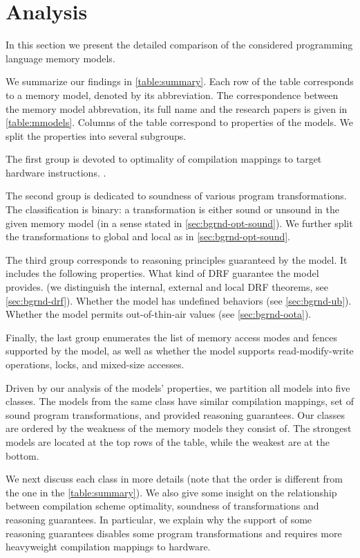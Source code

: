 \section{Analysis}

In this section we present the detailed comparison 
of the considered programming language memory models. 

We summarize our findings in \cref{table:summary}. 
Each row of the table corresponds to a memory model, denoted by its abbreviation. 
The correspondence between the memory model abbrevation, 
its full name and the research papers is given in \cref{table:mmodels}.
Columns of the table correspond to properties of the models. 
We split the properties into several subgroups. 

The first group is devoted to optimality of compilation mappings
to target hardware instructions. 
.

The second group is dedicated to soundness of various program transformations. 
The classification is binary: a transformation is either sound or unsound 
in the given memory model (in a sense stated in \cref{sec:bgrnd-opt-sound}).
We further split the transformations to global and local as in \cref{sec:bgrnd-opt-sound}.

The third group corresponds to reasoning principles guaranteed by the model. 
It includes the following properties. What kind of DRF guarantee the model provides.
(we distinguish the internal, external and local DRF theorems, see \cref{sec:bgrnd-drf}).
Whether the model has undefined behaviors (see \cref{sec:bgrnd-ub}).
Whether the model permits out-of-thin-air values (see \cref{sec:bgrnd-oota}).

Finally, the last group enumerates the list of memory access modes 
and fences supported by the model, as well as whether the model 
supports read-modify-write operations, locks, and mixed-size accesses.

Driven by our analysis of the models' properties, we partition all models into five classes. 
The models from the same class have similar compilation mappings, 
set of sound program transformations, and provided reasoning guarantees.
Our classes are ordered by the weakness of the memory models they consist of.  
The strongest models are located at the top rows of the table, 
while the weakest are at the bottom. 

We next discuss each class in more details
(note that the order is different from the one in the \cref{table:summary}). 
We also give some insight on the relationship
between compilation scheme optimality, 
soundness of transformations and reasoning guarantees.
In particular, we explain why the support of some reasoning guarantees 
disables some program transformations and requires more heavyweight 
compilation mappings to hardware.

